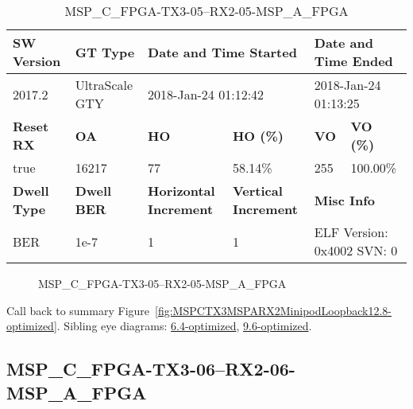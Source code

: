 \begin{table}[h]
\centering
\caption{MSP\_C\_FPGA-TX3-05--RX2-05-MSP\_A\_FPGA}
\label{tab:MSPCFPGATX305RX205MSPAFPGA12.8-optimized}
\begin{tabular}{@{}|l|l|l|l|l|l|@{}}
\toprule
\textbf{SW Version}                & \textbf{GT Type}   & \multicolumn{2}{l|}{\textbf{Date and Time Started}}            & \multicolumn{2}{l|}{\textbf{Date and Time Ended}}        \\ \midrule
2017.2                       & UltraScale GTY          & \multicolumn{2}{l|}{2018-Jan-24 01:12:42}                   & \multicolumn{2}{l|}{2018-Jan-24 01:13:25}               \\ \midrule
\textbf{Reset RX}                  & \textbf{OA} & \textbf{HO}   & \textbf{HO (\%)} & \textbf{VO} & \textbf{VO (\%)} \\ \midrule
true & 16217        & 77          & 58.14\%        & 255        & 100.00\%       \\ \midrule
\textbf{Dwell Type}                & \textbf{Dwell BER} & \textbf{Horizontal Increment} & \textbf{Vertical Increment}    & \multicolumn{2}{l|}{\textbf{Misc Info}}                  \\ \midrule
BER                            & 1e-7        & 1        & 1           & \multicolumn{2}{l|}{ELF Version: 0x4002 SVN: 0}                         \\ \bottomrule
\end{tabular}
\end{table}

\begin{figure}[h]
\caption{MSP\_C\_FPGA-TX3-05--RX2-05-MSP\_A\_FPGA} \label{fig:MSPCFPGATX305RX205MSPAFPGA12.8-optimized}
\end{figure}

Call back to summary Figure~\ref{fig:MSPCTX3MSPARX2MinipodLoopback12.8-optimized}.
Sibling eye diagrams: \hyperref[sec:MSPCFPGATX305RX205MSPAFPGA6.4-optimized]{6.4-optimized}, \hyperref[sec:MSPCFPGATX305RX205MSPAFPGA9.6-optimized]{9.6-optimized}.

\clearpage
\newpage


\subsection{MSP\_C\_FPGA-TX3-06--RX2-06-MSP\_A\_FPGA}\label{sec:MSPCFPGATX306RX206MSPAFPGA12.8-optimized}


